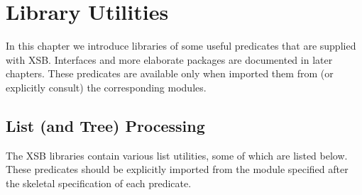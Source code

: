 \chapter{Library Utilities} \label{library_utilities}

In this chapter we introduce libraries of some useful predicates that
are supplied with XSB.  Interfaces and more elaborate packages are
documented in later chapters.  These predicates are available only
when imported them from (or explicitly consult) the corresponding
modules.


\section{List (and Tree) Processing}
The XSB libraries contain various list utilities, some of which are
listed below.  These predicates should be explicitly imported from the
module specified after the skeletal specification of each predicate.

